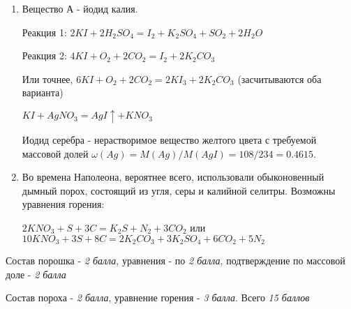 \solutionSection

\begin{enumerate}
    \item Вещество А - йодид калия.

    Реакция 1: $2KI + 2H_2SO_4 = I_2 + K_2SO_4 + SO_2 + 2H_2O$

    Реакция 2: $4KI + O_2 + 2CO_2 = I_2 + 2K_2CO_3$
    
    Или точнее, $6KI + O_2 + 2CO_2 = 2KI_3 + 2K_2CO_3$ (засчитываются оба варианта)

    $KI + AgNO_3 = AgI \uparrow + KNO_3$

    Иодид серебра - нерастворимое вещество желтого цвета с требуемой массовой долей $\omega(Ag)= M(Ag)/M(AgI) = 108/234 = 0.4615$.
    \item Во времена Наполеона, вероятнее всего, использовали обыконовенный дымный порох, состоящий из угля, серы и калийной селитры. Возможны уравнения горения:
    
    $2KNO_3 + S + 3C = K_2S + N_2 + 3CO_2$ или \\$10KNO_3 + 3S + 8C = 2K_2CO_3 + 3K_2SO_4 + 6CO_2 + 5N_2$
    
\end{enumerate}

Состав порошка - \textit{2 балла}, уравнения - по \textit{2 балла}, подтверждение по массовой доле - \textit{2 балла}

Состав пороха - \textit{2 балла},  уравнение горения - \textit{3 балла}. Всего \textit{15 баллов}
